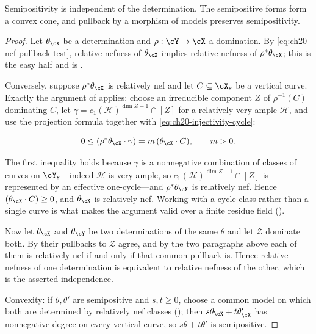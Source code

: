 \begin{proposition}\label{prop:ch20-semipositive-well-defined}
Semipositivity is independent of the determination.  The semipositive forms
form a convex cone, and pullback by a morphism of models preserves
semipositivity.
\end{proposition}

\begin{proof}
Let \(\theta_{\cX}\) be a determination and \(\rho:\cY\to\cX\) a
domination.  By \eqref{eq:ch20-nef-pullback-test}, relative nefness of
\(\theta_{\cX}\) implies relative nefness of \(\rho^*\theta_{\cX}\); this is
the easy half and is .

Conversely, suppose \(\rho^*\theta_{\cX}\) is relatively nef and let
\(C\subseteq\cX_s\) be a vertical curve.  Exactly the argument of
 applies: choose an irreducible component
\(Z\) of \(\rho^{-1}(C)\) dominating \(C\), let
\(\gamma=c_1(\mathcal H)^{\dim Z-1}\cap[Z]\) for a relatively very ample
\(\mathcal H\), and use the projection formula together with
\eqref{eq:ch20-injectivity-cycle}:

\[
 0\leq(\rho^*\theta_{\cX}\cdot\gamma)=m\,(\theta_{\cX}\cdot C),
 \qquad m>0 .
\]

The first inequality holds because \(\gamma\) is a nonnegative combination of
classes of curves on \(\cY_s\)---indeed \(\mathcal H\) is very ample, so
\(c_1(\mathcal H)^{\dim Z-1}\cap[Z]\) is represented by an effective
one-cycle---and \(\rho^*\theta_{\cX}\) is relatively nef.  Hence
\((\theta_{\cX}\cdot C)\geq0\), and \(\theta_{\cX}\) is relatively nef.
Working with a cycle class rather than a single curve is what makes the
argument valid over a finite residue field
().

Now let \(\theta_{\cX}\) and \(\theta_{\cY}\) be two determinations of the
same \(\theta\) and let \(\mathcal Z\) dominate both.  By
 their pullbacks to \(\mathcal Z\) agree, and
by the two paragraphs above each of them is relatively nef if and only if
that common pullback is.  Hence relative nefness of one determination is
equivalent to relative nefness of the other, which is the asserted
independence.

Convexity: if \(\theta,\theta'\) are semipositive and \(s,t\geq0\), choose a
common model on which both are determined by relatively nef classes
(); then
\(s\theta_{\cX}+t\theta'_{\cX}\) has nonnegative degree on every vertical
curve, so \(s\theta+t\theta'\) is semipositive.


\end{proof}
